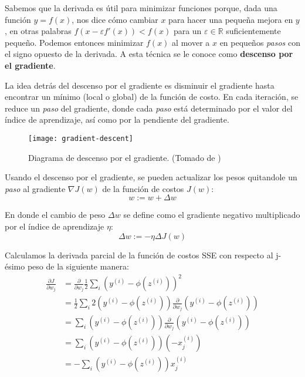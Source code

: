 Sabemos que la derivada es útil para minimizar funciones porque, dada
una función $y = f(x)$, nos dice cómo cambiar $x$ para hacer una
pequeña mejora en $y$, en otras palabras $f(x-\varepsilon f'(x)) <
f(x)$ para un $\varepsilon \in \mathbb{R}$ suficientemente
pequeño. Podemos entonces minimizar $f(x)$ al mover a $x$ en pequeños
\textit{pasos} con el signo opuesto de la derivada. A esta técnica se
le conoce como \textbf{descenso por el gradiente}.

La idea detrás del descenso por el gradiente es disminuir el gradiente hasta encontrar
un mínimo (local o global) de la función de costo. En cada iteración, se reduce
un \textit{paso} del gradiente, donde cada \textit{paso} está determinado por
el valor del índice de aprendizaje, así como por la pendiente del gradiente.

\begin{figure}[H]
\begin{center}
  \texttt{[image: gradient-descent]}
  \caption{Diagrama de descenso por el gradiente. (Tomado de \cite{python})}
\end{center}
\end{figure}

Usando el descenso por el gradiente, se pueden actualizar los pesos quitandole un \textit{paso}
al gradiente $\nabla J(w)$ de la función de costos $J(w)$:
\begin{equation}
  w:=w + \Delta w
\end{equation}

En donde el cambio de peso $\Delta w$ se define como el gradiente negativo multiplicado
por el índice de aprendizaje $\eta$:
\begin{equation}
  \Delta w:=-\eta \Delta J(w)
\end{equation}

Calculamos la derivada parcial de la función de costos SSE con respecto al
j-ésimo peso de la siguiente manera:
\begin{equation*}
\begin{split}
  \frac{\partial J}{\partial w_j} &= \frac{\partial}{\partial w_j}\frac{1}{2}\sum_i (y^{(i)} - \phi(z^{(i)}))^2 \\
  &= \frac{1}{2}\sum_i 2(y^{(i)} - \phi(z^{(i)}))\frac{\partial}{\partial w_j}(y^{(i)} - \phi(z^{(i)}))\\
  &= \sum_i (y^{(i)} - \phi(z^{(i)}))\frac{\partial}{\partial w_j}(y^{(i)} - \phi (z^{(i)}))\\
  &= \sum_i(y^{(i)} - \phi(z^{(i)}))(-x_j^{(i)})\\
  &= -\sum_i(y^{(i)} - \phi(z^{(i)}))x_j^{(i)}
\end{split}
\end{equation*}

